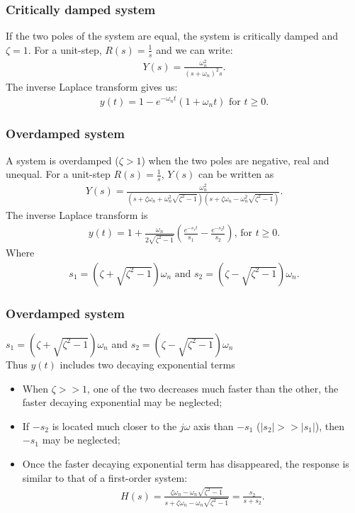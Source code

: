 \begin{frame}
\frametitle{Critically damped system}
If the two poles of the system are equal, the system is critically damped and $\zeta=1$. For a unit-step, $R(s)=\frac{1}{s}$ and we can write:
\begin{align*}
Y(s) =\frac{\omega_n ^2}{(s+\omega_n)^2 s}.
\end{align*}
The inverse Laplace transform gives us:
\begin{align*}
y(t) = 1 - e^{-\omega_n t}(1+\omega_n t) \text{ for } t\ge 0.
\end{align*}         
\end{frame}

\begin{frame}
\frametitle{Overdamped system}
A system is overdamped ($\zeta>1$) when the two poles are negative, real and unequal.
\vspace{0.25cm}
For a unit-step $R(s)=\frac{1}{s}$, $Y(s)$ can be written as
\vspace{-0.5cm}
\begin{align*}
Y(s) = \frac{\omega_n ^2}{(s+\zeta\omega_n + \omega_n ^2\sqrt{\zeta^2 -1})(s+\zeta\omega_n - \omega_n ^2\sqrt{\zeta^2 -1})}.
\end{align*} 
The inverse Laplace transform is
\vspace{-0.5cm}
\begin{align*}
y(t) = 1 +\frac{\omega_n}{2\sqrt{\zeta^2-1}}(\frac{e^{-s_1 t}}{s_1} - \frac{e^{-s_2 t}}{s_2})\text{, for } t\ge 0.
\end{align*}
Where
\vspace{-0.5cm}
\begin{align*}
s_1 = (\zeta +\sqrt{\zeta^2 -1})\omega_n\text{ and } s_2 = (\zeta -\sqrt{\zeta^2 -1})\omega_n.
\end{align*}
\end{frame}

\begin{frame}
\frametitle{Overdamped system}
$s_1 = (\zeta +\sqrt{\zeta^2 -1})\omega_n$ and $s_2 = (\zeta -\sqrt{\zeta^2 -1})\omega_n$
\\ Thus $y(t)$ includes two decaying exponential terms
\begin{itemize}
\item When $\zeta >> 1$, one of the two decreases much faster than the other, the faster decaying exponential may be neglected;
\item If $-s_2$ is located much closer to the $j\omega$ axis than $-s_1$ ($|s_2|>>|s_1|$), then $-s_1$ may be neglected;
\item Once the faster decaying exponential term has disappeared, the response is similar to that of a first-order system:
\begin{align*}
H(s) = \frac{\zeta\omega_n - \omega_n\sqrt{\zeta^2-1}}{s+\zeta\omega_n -\omega_n\sqrt{\zeta^2-1}}=\frac{s_2}{s+s_2}.
\end{align*}
\end{itemize}
\end{frame}

